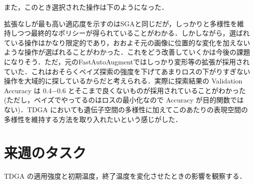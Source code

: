 \documentclass[onecolumn]{ujarticle}   %
\begin{document}
  また，このとき選択された操作は下のようになった．
  

  拡張なしが最も高い適応度を示すのはSGAと同じだが，しっかりと多様性を維持しつつ最終的なポリシーが得られていることがわかる．しかしながら，選ばれている操作はかなり限定的であり，おおよそ元の画像に位置的な変化を加えないような操作が選ばれることがわかった．これをどう改善していくかは今後の課題になりそう．ただ，元のFastAutoAugmentではしっかり変形等の拡張が採用されていた．これはおそらくベイズ探索の強度を下げてあまりロスの下がりすぎない操作を大域的に探しているからだと考えられる．実際に探索結果の Validation Accuracy は 0.4−0.6 とそこまで良くないものが採用されていることがわかった(ただし，ベイズでやってるのはロスの最小化なので Accuracy が目的関数ではない)．TDGA においても遺伝子空間の多様性に加えてこのあたりの表現空間の多様性を維持する方法を取り入れたいという感じがした．

	\section{来週のタスク}
	TDGA の適用強度と初期温度，終了温度を変化させたときの影響を観察する．

\end{document}
